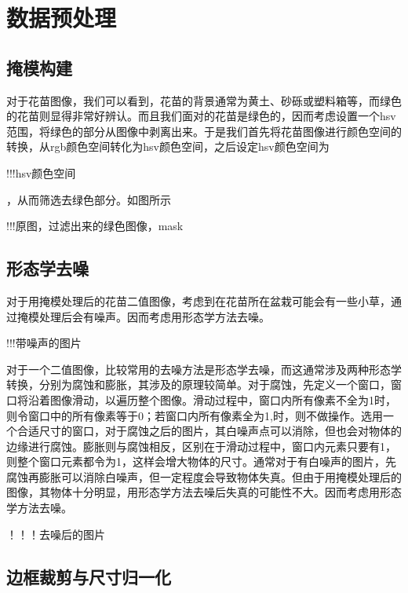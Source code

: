 \section{数据预处理}
\subsection{掩模构建}
对于花苗图像，我们可以看到，花苗的背景通常为黄土、砂砾或塑料箱等，而绿色的花苗则显得非常好辨认。而且我们面对的花苗是绿色的，因而考虑设置一个hsv范围，将绿色的部分从图像中剥离出来。于是我们首先将花苗图像进行颜色空间的转换，从rgb颜色空间转化为hsv颜色空间，之后设定hsv颜色空间为

!!!hsv颜色空间

，从而筛选去绿色部分。如图所示

!!!原图，过滤出来的绿色图像，mask

\subsection{形态学去噪}
对于用掩模处理后的花苗二值图像，考虑到在花苗所在盆栽可能会有一些小草，通过掩模处理后会有噪声。因而考虑用形态学方法去噪。

!!!带噪声的图片

对于一个二值图像，比较常用的去噪方法是形态学去噪，而这通常涉及两种形态学转换，分别为腐蚀和膨胀，其涉及的原理较简单。对于腐蚀，先定义一个窗口，窗口将沿着图像滑动，以遍历整个图像。滑动过程中，窗口内所有像素不全为1时，则令窗口中的所有像素等于0；若窗口内所有像素全为1,时，则不做操作。选用一个合适尺寸的窗口，对于腐蚀之后的图片，其白噪声点可以消除，但也会对物体的边缘进行腐蚀。膨胀则与腐蚀相反，区别在于滑动过程中，窗口内元素只要有1，则整个窗口元素都令为1，这样会增大物体的尺寸。通常对于有白噪声的图片，先腐蚀再膨胀可以消除白噪声，但一定程度会导致物体失真。但由于用掩模处理后的图像，其物体十分明显，用形态学方法去噪后失真的可能性不大。因而考虑用形态学方法去噪。

！！！去噪后的图片

\subsection{边框裁剪与尺寸归一化}

